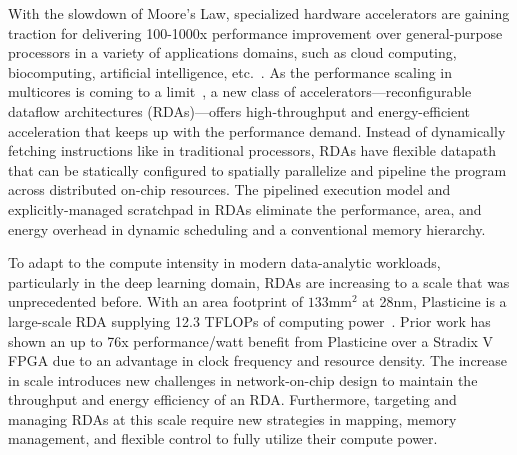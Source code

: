 
With the slowdown of Moore’s Law, specialized hardware accelerators are gaining traction for delivering 100-1000x performance improvement over general-purpose processors in a variety of applications domains, such as cloud computing, biocomputing, 
artificial intelligence, etc.~\cite{fpgacloudsurvey,bioaccel,genomicaccel}.
As the performance scaling in multicores is coming to a limit~\cite{multicorescale}, a new class of
accelerators---reconfigurable dataflow architectures (RDAs)---offers high-throughput and energy-efficient acceleration that keeps up with the performance demand.
Instead of dynamically fetching instructions like in traditional processors, RDAs have flexible datapath  that can be statically configured to spatially parallelize and pipeline the program across
distributed on-chip resources. 
The pipelined execution model and explicitly-managed scratchpad in RDAs eliminate the performance, area, and energy overhead in dynamic scheduling and a conventional memory hierarchy.

To adapt to the compute intensity in modern data-analytic workloads, particularly in the deep learning domain, RDAs are increasing to a scale that was unprecedented before.
With an area footprint of $133\text{mm}^2$ at 28nm, 
Plasticine is a large-scale RDA supplying 12.3 TFLOPs of computing power~\cite{plasticine}.
Prior work has shown an up to 76x performance/watt benefit from Plasticine over a Stradix V FPGA 
due to an advantage in clock frequency and resource density.
The increase in scale introduces new challenges in network-on-chip design to maintain 
the throughput and energy efficiency of an RDA.
Furthermore, targeting and managing RDAs at this scale require new strategies in mapping,  memory management, and flexible control to fully utilize their compute power. 

